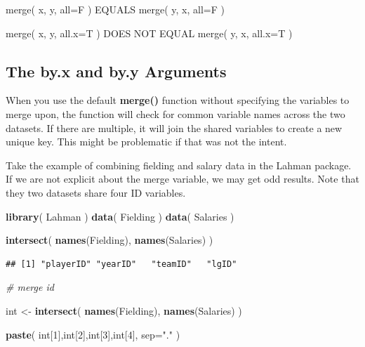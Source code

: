 \documentclass[]{book}
\newenvironment{Shaded}{\begin{snugshade}}{\end{snugshade}}
\newcommand{\CommentTok}[1]{\textcolor[rgb]{0.56,0.35,0.01}{\textit{#1}}}
\newcommand{\DataTypeTok}[1]{\textcolor[rgb]{0.13,0.29,0.53}{#1}}
\newcommand{\DecValTok}[1]{\textcolor[rgb]{0.00,0.00,0.81}{#1}}
\newcommand{\KeywordTok}[1]{\textcolor[rgb]{0.13,0.29,0.53}{\textbf{#1}}}
\newcommand{\NormalTok}[1]{#1}
\newcommand{\StringTok}[1]{\textcolor[rgb]{0.31,0.60,0.02}{#1}}
\theoremstyle{definition}
\theoremstyle{definition}
\theoremstyle{definition}
\theoremstyle{remark}
\begin{document}
merge( x, y, all=F ) EQUALS merge( y, x, all=F )

merge( x, y, all.x=T ) DOES NOT EQUAL merge( y, x, all.x=T )

\hypertarget{the-by.x-and-by.y-arguments}{%
\subsection{The by.x and by.y
Arguments}\label{the-by.x-and-by.y-arguments}}

When you use the default \textbf{merge()} function without specifying
the variables to merge upon, the function will check for common variable
names across the two datasets. If there are multiple, it will join the
shared variables to create a new unique key. This might be problematic
if that was not the intent.

Take the example of combining fielding and salary data in the Lahman
package. If we are not explicit about the merge variable, we may get odd
results. Note that they two datasets share four ID variables.

\begin{Shaded}
\begin{Highlighting}[]
\KeywordTok{library}\NormalTok{( Lahman )}
\KeywordTok{data}\NormalTok{( Fielding )}
\KeywordTok{data}\NormalTok{( Salaries )}
\end{Highlighting}
\end{Shaded}

\begin{Shaded}
\begin{Highlighting}[]
\KeywordTok{intersect}\NormalTok{( }\KeywordTok{names}\NormalTok{(Fielding), }\KeywordTok{names}\NormalTok{(Salaries) )}
\end{Highlighting}
\end{Shaded}

\begin{verbatim}
## [1] "playerID" "yearID"   "teamID"   "lgID"
\end{verbatim}

\begin{Shaded}
\begin{Highlighting}[]
\CommentTok{# merge id}

\NormalTok{int <-}\StringTok{ }\KeywordTok{intersect}\NormalTok{( }\KeywordTok{names}\NormalTok{(Fielding), }\KeywordTok{names}\NormalTok{(Salaries) )}

\KeywordTok{paste}\NormalTok{( int[}\DecValTok{1}\NormalTok{],int[}\DecValTok{2}\NormalTok{],int[}\DecValTok{3}\NormalTok{],int[}\DecValTok{4}\NormalTok{], }\DataTypeTok{sep=}\StringTok{"."}\NormalTok{ )}
\end{Highlighting}
\end{Shaded}
\end{document}
